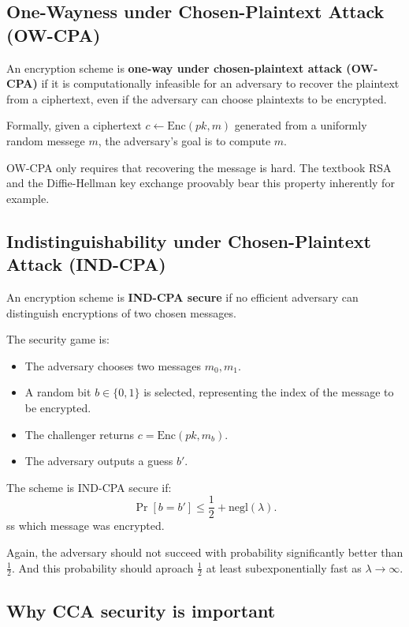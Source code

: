 \begin{itemize}
\subsection{One-Wayness under Chosen-Plaintext Attack (OW-CPA)}

An encryption scheme is \textbf{one-way under chosen-plaintext attack (OW-CPA)} if it is computationally infeasible for an adversary to recover the plaintext from a ciphertext, even if the adversary can choose plaintexts to be encrypted.

Formally, given a ciphertext $c \leftarrow \text{Enc}(pk, m)$ generated from a uniformly random messege \(m\), the adversary’s goal is to compute \(m\).

OW-CPA only requires that recovering the message is hard. The textbook RSA and the Diffie-Hellman key exchange proovably bear this property inherently for example.

\subsection{Indistinguishability under Chosen-Plaintext Attack (IND-CPA)}

An encryption scheme is \textbf{IND-CPA secure} if no efficient adversary can distinguish encryptions of two chosen messages.

The security game is:
\begin{itemize}
    \item The adversary chooses two messages \(m_0, m_1\).
    \item A random bit \(b \in \{0,1\}\) is selected, representing the index of the message to be encrypted.
    \item The challenger returns \(c = \text{Enc}(pk, m_b)\).
    \item The adversary outputs a guess \(b'\).
\end{itemize}

The scheme is IND-CPA secure if:
\[
\Pr[b = b'] \leq \frac{1}{2} + \text{negl}(\lambda).
\]ss which message was encrypted.
\end{itemize}

Again, the adversary should not succeed with probability significantly better than $\frac{1}{2}$. And this probability should aproach $\frac{1}{2}$ at least subexponentially fast as $\lambda \to \infty$.

\subsection{Why CCA security is important}

